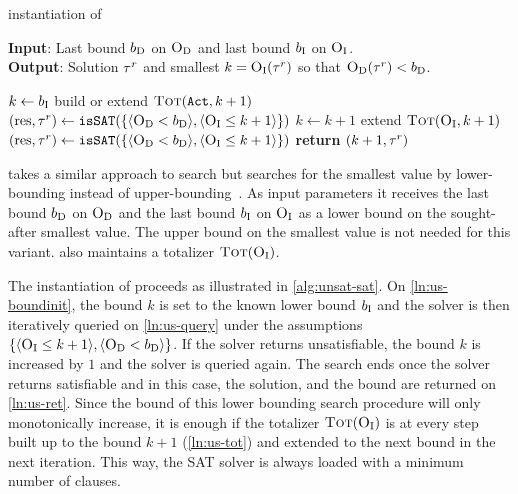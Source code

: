 \begin{algorithm}[t]
  \caption{\unsatsat{} instantiation of \Min{}}\label{alg:unsat-sat}
  \textbf{Input}: Last bound $b_{\text{D}}$ on $\textsc{O}_{\text{D}}$ and last bound $b_{\text{I}}$ on $\textsc{O}_{\text{I}}$. \\
  \textbf{Output}: Solution $\tau^r$ and smallest $k=\textsc{O}_{\text{I}}(\tau^r)$ so that $\textsc{O}_{\text{D}}(\tau^r)<b_{\text{D}}$.

  \begin{algorithmic}[1]
    \STATE $k \gets b_{\text{I}}$ \label{ln:us-boundinit}
    \STATE build or extend $\textsc{Tot}(\texttt{Act},k+1)$
    \STATE $(\text{res},\tau^r) \gets \texttt{isSAT}(\{\langle \textsc{O}_{\text{D}} < b_{\text{D}} \rangle, \langle \textsc{O}_{\text{I}} \leq k+1 \rangle\})$
    \WHILE{$\res = \unsat$}
      \STATE $k \gets k+1$
      \STATE extend $\textsc{Tot}(\textsc{O}_{\text{I}},k+1)$ \label{ln:us-tot}
      \STATE $(\text{res},\tau^r) \gets \texttt{isSAT}(\{\langle \textsc{O}_{\text{D}} < b_{\text{D}} \rangle, \langle \textsc{O}_{\text{I}} \leq k+1 \rangle\})$ \label{ln:us-query}
    \ENDWHILE
    \STATE \textbf{return} $(k+1,\tau^r)$ \label{ln:us-ret}
  \end{algorithmic}
\end{algorithm}

\unsatsat{} takes a similar approach to \satunsat{} search but searches for the smallest value by lower-bounding instead of upper-bounding~\autocite{}.
As input parameters it receives the last bound $b_{\text{D}}$ on $\textsc{O}_{\text{D}}$ and the last bound $b_{\text{I}}$ on $\textsc{O}_{\text{I}}$ as a lower bound on the sought-after smallest value.
The upper bound on the smallest value is not needed for this variant.
\unsatsat{} also maintains a totalizer $\textsc{Tot}(\textsc{O}_{\text{I}})$.

The \unsatsat{} instantiation of \Min{} proceeds as illustrated in \cref{alg:unsat-sat}.
On \cref{ln:us-boundinit}, the bound $k$ is set to the known lower bound $b_{\text{I}}$ and the solver is then iteratively queried on \cref{ln:us-query} under the assumptions $\{ \langle \textsc{O}_{\text{I}} \leq k+1 \rangle, \langle \textsc{O}_{\text{D}} < b_{\text{D}} \rangle \}$.
If the solver returns unsatisfiable, the bound $k$ is increased by $1$ and the solver is queried again.
The search ends once the solver returns satisfiable and in this case, the solution, and the bound are returned on \cref{ln:us-ret}.
Since the bound of this lower bounding search procedure will only monotonically increase, it is enough if the totalizer $\textsc{Tot}(\textsc{O}_{\text{I}})$ is at every step built up to the bound $k+1$ (\cref{ln:us-tot}) and extended to the next bound in the next iteration.
This way, the SAT solver is always loaded with a minimum number of clauses.

